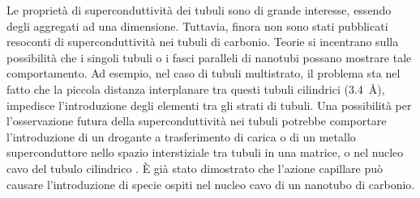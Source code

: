 \documentclass[a4paper,titlepage]{book}
\begin{document}
Le proprietà di superconduttività dei tubuli sono di grande interesse, essendo degli aggregati ad una dimensione. Tuttavia, finora non sono stati pubblicati resoconti di superconduttività nei tubuli di carbonio. Teorie si incentrano sulla possibilità che i singoli tubuli o i fasci paralleli di nanotubi possano mostrare tale comportamento. Ad esempio, nel caso di tubuli  multistrato, il problema sta nel fatto che la piccola distanza interplanare tra questi tubuli cilindrici (\SI{3.4}{\angstrom}), impedisce l'introduzione degli elementi tra gli strati di tubuli. Una possibilità per l'osservazione futura della superconduttività nei tubuli potrebbe comportare l'introduzione di un drogante a trasferimento di carica o di un metallo superconduttore nello spazio interstiziale tra tubuli in una matrice, o nel nucleo cavo del tubulo cilindrico . È già stato dimostrato che l'azione capillare può causare l'introduzione di specie ospiti nel nucleo cavo di un nanotubo di carbonio.
\end{document}
